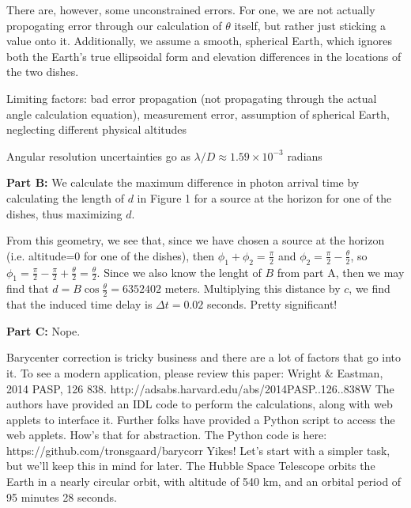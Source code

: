 \documentclass[12pt]{article}
\begin{document}
\begin{onehalfspacing}
There are, however, some unconstrained errors. For one, we are not actually propogating error through our calculation of $\theta$ itself, but rather just sticking a value onto it. Additionally, we assume a smooth, spherical Earth, which ignores both the Earth's true ellipsoidal form and elevation differences in the locations of the two dishes.


Limiting factors: bad error propagation (not propagating through the actual angle calculation equation), measurement error, assumption of spherical Earth, neglecting different physical altitudes

\bigskip

Angular resolution uncertainties go as $\lambda/D \approx 1.59 \times 10^{-3}$ radians

\bigskip
\bigskip
\raggedright{\textbf{\large Part B: }}
We calculate the maximum difference in photon arrival time by calculating the length of $d$ in Figure 1 for a source at the horizon for one of the dishes, thus maximizing $d$.


From this geometry, we see that, since we have chosen a source at the horizon (i.e. altitude=0 for one of the dishes), then $\phi_1 + \phi_2 = \frac{\pi}{2}$ and $\phi_2 = \frac{\pi}{2} - \frac{\theta}{2}$, so $\phi_1 = \frac{\pi}{2} - \frac{\pi}{2} + \frac{\theta}{2} = \frac{\theta}{2}$. Since we also know the lenght of $B$ from part A, then we may find that $d = B \cos{\frac{\theta}{2}} = 6352402$ meters. Multiplying this distance by $c$, we find that the induced time delay is $\Delta t = 0.02$ seconds. Pretty significant!


\bigskip
\bigskip
\raggedright{\textbf{\large Part C: }}
Nope.

\bigskip
\bigskip









\iffalse
Barycenter correction is tricky business and there are a lot of factors that go into it. To
see a modern application, please review this paper: Wright & Eastman, 2014 PASP,
126 838.
http://adsabs.harvard.edu/abs/2014PASP..126..838W
The authors have provided an IDL code to perform the calculations, along with web
applets to interface it. Further folks have provided a Python script to access the web
applets. How’s that for abstraction. The Python code is here:
https://github.com/tronsgaard/barycorr
Yikes! Let’s start with a simpler task, but we’ll keep this in mind for later. The Hubble
Space Telescope orbits the Earth in a nearly circular orbit, with altitude of 540 km, and
an orbital period of 95 minutes 28 seconds.


\end{onehalfspacing}
\end{document}
